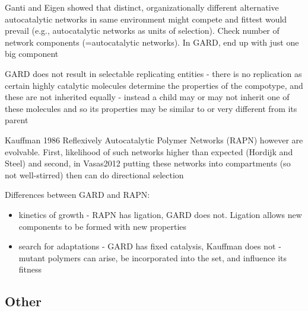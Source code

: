 Ganti and Eigen showed that distinct, organizationally different alternative autocatalytic networks in same environment might compete and fittest would prevail (e.g., autocatalytic networks as units of selection).	Check number of network components (=autocatalytic networks). In GARD, end up with just one big component

GARD does not result in selectable replicating entities - there is no replication as certain highly catalytic molecules determine the properties of the compotype, and these are not inherited equally - instead a child may or may not inherit one of these molecules and so its properties may be similar to or very different from its parent

Kauffman 1986 Reflexively Autocatalytic Polymer Networks (RAPN) however are evolvable. First, likelihood of such networks higher than expected (Hordijk and Steel) and second, in Vasas2012 putting these networks into compartments (so not well-stirred) then can do directional selection

Differences between GARD and RAPN:
\begin{itemize}
	\item
	kinetics of growth - RAPN has ligation, GARD does not. Ligation allows new components to be formed with new properties
	\item
	search for adaptations - GARD has fixed catalysis, Kauffman does not - mutant polymers can arise, be incorporated into the set, and influence its fitness
\end{itemize}

\subsection{Other}	
	

		


